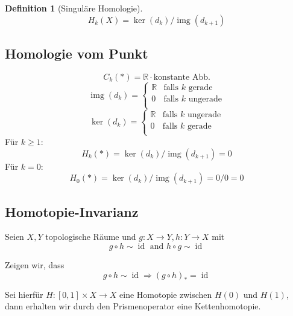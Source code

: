 \documentclass{article}
\DeclareMathOperator{\img}{img}
\DeclareMathOperator{\id}{id}
\newtheorem{definition}{Definition}
\begin{document}
	\begin{definition}[Singuläre Homologie]
		\begin{equation*}
			H_k(X) = \ker(d_k) / \img(d_{k+1})
		\end{equation*}
	\end{definition}
	
	\subsection{Homologie vom Punkt}
	
	\begin{equation*}
		C_k(*) = ℝ · \text{konstante Abb.}
	\end{equation*}
	\begin{equation*}
		\img(d_k) = \begin{cases}
			ℝ & \text{falls $k$ gerade}\\
			0 & \text{falls $k$ ungerade}\\
		\end{cases}	
	\end{equation*}
	\begin{equation*}
		\ker(d_k) = \begin{cases}
			ℝ & \text{falls $k$ ungerade}\\
			0 & \text{falls $k$ gerade}\\
		\end{cases}
	\end{equation*}
	Für $k≥1$:
	\begin{equation*}
		H_k(*) = \ker(d_k) / \img(d_{k+1}) = 0
	\end{equation*}
	Für $k=0$:
	\begin{equation*}
		H_0(*) = \ker(d_k) / \img(d_{k+1}) = 0/0 = 0
	\end{equation*}
	
	\subsection{Homotopie-Invarianz}
	
	Seien $X, Y$ topologische Räume und $g: X→Y, h: Y→X$ mit
	\begin{equation*}
		g ∘ h \sim \id \text{ and } h∘g \sim \id
	\end{equation*}
	
	Zeigen wir, dass
	\begin{equation*}
		g∘h \sim \id ⇒ (g∘h)_* = \id
	\end{equation*}
	
	Sei hierfür $H: [0,1] × X → X$ eine Homotopie zwischen $H(0)$ und $H(1)$, dann erhalten wir durch den Prismenoperator eine Kettenhomotopie.
	
\end{document}
